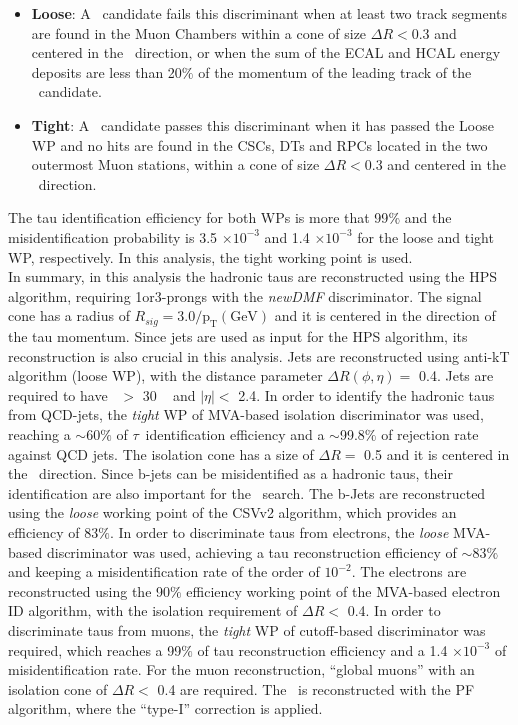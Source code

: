 \begin{itemize}
 \item \textbf{Loose}: A \tauh~candidate fails this discriminant when at least two track segments are found 
 in the Muon Chambers within a cone of size $\Delta R < 0.3$ and centered in the \tauh~direction, or when 
 the sum of the ECAL and HCAL energy deposits are less than 20$\%$ of the momentum of the leading track
 of the \tauh~candidate.
 \item \textbf{Tight}: A \tauh~candidate passes this discriminant when it has passed the Loose WP and no hits are found in 
 the CSCs, DTs and RPCs located in the two outermost Muon stations, within a cone of size $\Delta R < 0.3$ and 
 centered in the \tauh~direction.
\end{itemize}

\noindent The tau identification efficiency for both WPs is more that 99$\%$ and
the misidentification probability is 3.5 $\times 10^{-3}$ and 1.4 $\times 10^{-3}$
for the loose and tight WP, respectively. In this analysis, the tight working point is used.\\


\noindent In summary, in this analysis the hadronic taus are reconstructed using the HPS algorithm,
requiring 1or3-prongs with the \textit{newDMF} discriminator. The signal cone has 
a radius of $R_{sig}=3.0 / \textrm{p}_{\textrm{T}} (\textrm{GeV})$ and it is centered in 
the direction of the tau momentum. Since jets are used as input for 
the HPS algorithm, its reconstruction is also crucial in this analysis. Jets are reconstructed 
using anti-kT algorithm (loose WP), with the distance parameter $\Delta R(\phi,\eta) =$ 0.4.
Jets are required to have \pt~$>$ 30 \GeV~ and $|\eta| <$ 2.4. In order to identify
the hadronic taus from QCD-jets, the \textit{tight} WP of MVA-based isolation discriminator was 
 used, reaching a $\sim$60$\%$  of $\tau$~identification efficiency and 
 a $\sim$99.8$\%$ of rejection rate against QCD jets. The isolation cone has a 
size of $\Delta R =$ 0.5 and it is centered in the \tauh~direction. Since
b-jets can be misidentified as a hadronic taus, their identification are also 
important for the \Zprimetotauh~search. The b-Jets are reconstructed using 
the \textit{loose} working point of the CSVv2 algorithm, which provides an efficiency of
83$\%$. In order to discriminate taus from electrons, the \textit{loose} MVA-based discriminator 
was used, achieving a tau reconstruction efficiency of $\sim$83$\%$ and keeping a misidentification
 rate of the order of $10 ^{-2}$. The electrons are reconstructed using the 90$\%$ efficiency 
 working point of the MVA-based electron ID algorithm, with the isolation requirement of $\Delta R <$ 0.4.
 In order to discriminate taus from muons, the \textit{tight} WP of cutoff-based discriminator was
 required, which reaches a 99$\%$ of tau reconstruction efficiency and a 1.4 $\times 10^{-3}$ 
 of misidentification rate. For the muon reconstruction, ``global muons'' with an 
 isolation cone of $\Delta R <$ 0.4 are required. The \METv~is reconstructed
 with the PF algorithm, where the “type-I” correction is applied. 

